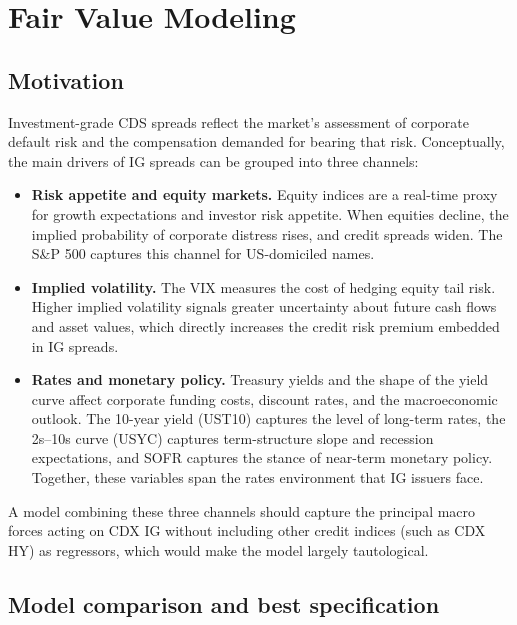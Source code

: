\section{Fair Value Modeling}

\subsection*{Motivation}

Investment-grade CDS spreads reflect the market's assessment of corporate
default risk and the compensation demanded for bearing that risk. Conceptually,
the main drivers of IG spreads can be grouped into three channels:

\begin{itemize}
  \item \textbf{Risk appetite and equity markets.} Equity indices are a
    real-time proxy for growth expectations and investor risk appetite. When
    equities decline, the implied probability of corporate distress rises, and
    credit spreads widen. The S\&P 500 captures this channel for US-domiciled
    names.

  \item \textbf{Implied volatility.} The VIX measures the cost of hedging
    equity tail risk. Higher implied volatility signals greater uncertainty
    about future cash flows and asset values, which directly increases the
    credit risk premium embedded in IG spreads.

  \item \textbf{Rates and monetary policy.} Treasury yields and the shape of
    the yield curve affect corporate funding costs, discount rates, and the
    macroeconomic outlook. The 10-year yield (UST10) captures the level of
    long-term rates, the 2s--10s curve (USYC) captures term-structure slope
    and recession expectations, and SOFR captures the stance of near-term
    monetary policy. Together, these variables span the rates environment that
    IG issuers face.
\end{itemize}

A model combining these three channels should capture the principal macro forces
acting on CDX IG without including other credit indices (such as CDX HY) as
regressors, which would make the model largely tautological.

\subsection*{Model comparison and best specification}

